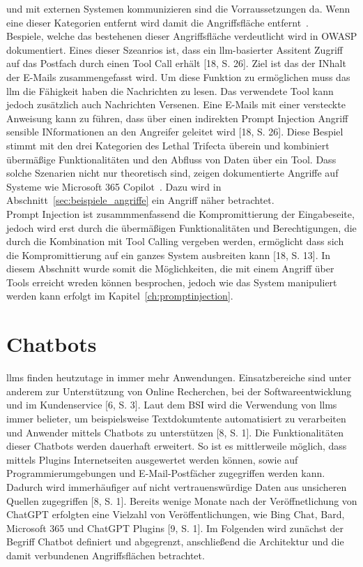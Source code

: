 und mit externen Systemen kommunizieren sind die Vorraussetzungen da. Wenn eine dieser Kategorien entfernt wird damit die Angriffsfläche entfernt~\cite[13]{pi24}. \\
Bespiele, welche das bestehenen dieser Angriffsfläche verdeutlicht wird in OWASP dokumentiert. Eines dieser Szeanrios ist, dass ein \ac{llm}-basierter Assitent
Zugriff auf das Postfach durch einen Tool Call erhält [18, S. 26]. Ziel ist das der INhalt der E-Mails zusammengefasst wird. Um diese Funktion zu ermöglichen 
muss das \ac{llm} die Fähigkeit haben die Nachrichten zu lesen. Das verwendete Tool kann jedoch zusätzlich auch Nachrichten Versenen. Eine E-Mails mit einer 
versteckte Anweisung kann zu führen, dass über einen indirekten Prompt Injection Angriff sensible INformationen an den Angreifer geleitet wird [18, S. 26].
Diese Bespiel stimmt mit den drei Kategorien des Lethal Trifecta überein und kombiniert übermäßige Funktionalitäten und den Abfluss von Daten über ein Tool.
Dass solche Szenarien nicht nur theoretisch sind, zeigen dokumentierte Angriffe auf Systeme wie Microsoft 365 Copilot~\cite[16]{pi24}. Dazu wird in 
Abschnitt~\ref{sec:beispiele_angriffe} ein Angriff näher betrachtet. \\
Prompt Injection ist zusammmenfassend die Kompromittierung der Eingabeseite, jedoch wird erst durch die übermäßigen Funktionalitäten und Berechtigungen, die durch
die Kombination mit Tool Calling vergeben werden, ermöglicht dass sich die Kompromittierung auf ein ganzes System ausbreiten kann [18, S. 13]. In diesem Abschnitt
wurde somit die Möglichkeiten, die mit einem Angriff über Tools erreicht wreden können besprochen, jedoch wie das System manipuliert werden kann erfolgt im
Kapitel~\ref{ch:promptinjection}.

\section{Chatbots}

\ac{llm}s finden heutzutage in immer mehr Anwendungen. Einsatzbereiche sind unter anderem zur Unterstützung von Online Recherchen, bei der Softwareentwicklung 
und im Kundenservice [6, S. 3]. Laut dem BSI wird die Verwendung von \ac{llm}s immer belieter, um beispielsweise Textdokumtente automatisiert zu verarbeiten
und Anwender mittels Chatbots zu unterstützen [8, S. 1]. Die Funktionalitäten dieser Chatbots werden dauerhaft erweitert. So ist es mittlerweile
möglich, dass mittels Plugins Internetseiten ausgewertet werden können, sowie auf Programmierumgebungen und E-Mail-Postfächer zugegriffen werden kann. Dadurch 
wird immerhäufiger auf nicht vertrauenswürdige Daten aus unsicheren Quellen zugegriffen [8, S. 1]. Bereits wenige Monate nach der Veröffnetlichung von ChatGPT 
erfolgten eine Vielzahl von Veröffentlichungen, wie Bing Chat, Bard, Microsoft 365 und
ChatGPT Plugins [9, S. 1]. Im Folgenden wird zunächst der Begriff Chatbot definiert und abgegrenzt, anschließend die Architektur und die damit verbundenen 
Angriffsflächen betrachtet.

